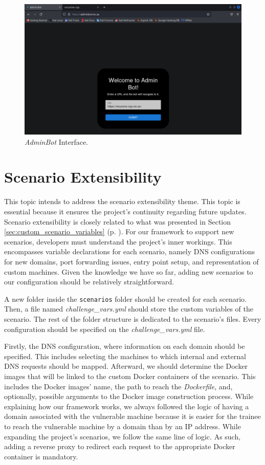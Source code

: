 \begin{figure}[H]
    \includegraphics[width=12cm]{figures/adminbot.png}
    \caption{\textit{AdminBot} Interface.}
    \label{fig:admin_bot}
\end{figure}

\section{Scenario Extensibility} \label{sec:validation_scenario_extensibility}

This topic intends to address the scenario extensibility theme. This topic is essential because it ensures the project's continuity regarding future updates. Scenario extensibility is closely related to what was presented in Section \ref{sec:custom_scenario_variables} (p. \pageref{sec:custom_scenario_variables}). For our framework to support new scenarios, developers must understand the project's inner workings. This encompasses variable declarations for each scenario, namely DNS configurations for new domains, port forwarding issues, entry point setup, and representation of custom machines. Given the knowledge we have so far, adding new scenarios to our configuration should be relatively straightforward. 

A new folder inside the \texttt{scenarios} folder should be created for each scenario. Then, a file named \textit{challenge\_vars.yml} should store the custom variables of the scenario. The rest of the folder structure is dedicated to the scenario's files. Every configuration should be specified on the \textit{challenge\_vars.yml} file.

Firstly, the DNS configuration, where information on each domain should be specified. This includes selecting the machines to which internal and external DNS requests should be mapped. Afterward, we should determine the Docker images that will be linked to the custom Docker containers of the scenario. This includes the Docker images' name, the path to reach the \textit{Dockerfile}, and, optionally, possible arguments to the Docker image construction process. While explaining how our framework works, we always followed the logic of having a domain associated with the vulnerable machine because it is easier for the trainee to reach the vulnerable machine by a domain than by an IP address. While expanding the project's scenarios, we follow the same line of logic. As such, adding a reverse proxy to redirect each request to the appropriate Docker container is mandatory. 

